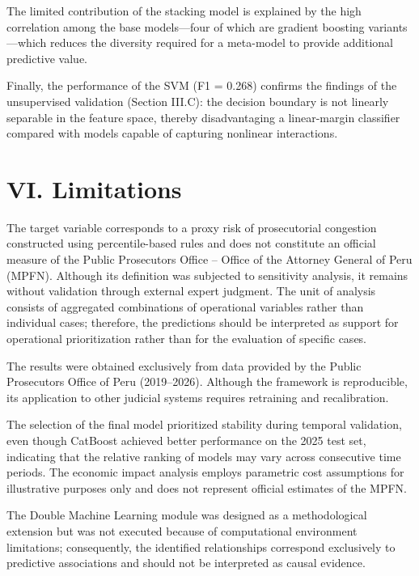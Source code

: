 \documentclass[
  number]{elsarticle}
\begin{document}
The limited contribution of the stacking model is explained by the high
correlation among the base models---four of which are gradient boosting
variants---which reduces the diversity required for a meta-model to
provide additional predictive value.

Finally, the performance of the SVM (F1 = 0.268) confirms the findings
of the unsupervised validation (Section III.C): the decision boundary is
not linearly separable in the feature space, thereby disadvantaging a
linear-margin classifier compared with models capable of capturing
nonlinear interactions.

\section{VI. Limitations}\label{vi.-limitations}

The target variable corresponds to a proxy risk of prosecutorial
congestion constructed using percentile-based rules and does not
constitute an official measure of the Public
Prosecutor\textquotesingle s Office -- Office of the Attorney General of
Peru (MPFN). Although its definition was subjected to sensitivity
analysis, it remains without validation through external expert
judgment. The unit of analysis consists of aggregated combinations of
operational variables rather than individual cases; therefore, the
predictions should be interpreted as support for operational
prioritization rather than for the evaluation of specific cases.

The results were obtained exclusively from data provided by the Public
Prosecutor\textquotesingle s Office of Peru (2019--2026). Although the
framework is reproducible, its application to other judicial systems
requires retraining and recalibration.

The selection of the final model prioritized stability during temporal
validation, even though CatBoost achieved better performance on the 2025
test set, indicating that the relative ranking of models may vary across
consecutive time periods. The economic impact analysis employs
parametric cost assumptions for illustrative purposes only and does not
represent official estimates of the MPFN.

The Double Machine Learning module was designed as a methodological
extension but was not executed because of computational environment
limitations; consequently, the identified relationships correspond
exclusively to predictive associations and should not be interpreted as
causal evidence.
\end{document}
